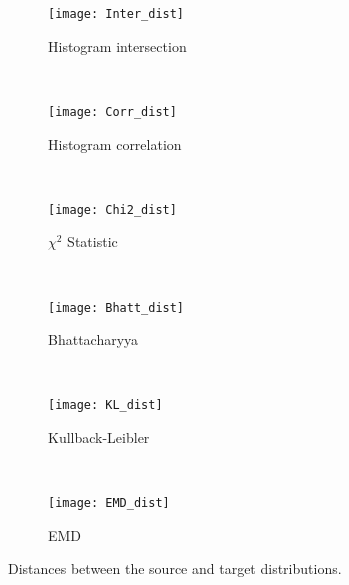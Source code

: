 \begin{figure}[!ht]
    \centering
    \begin{subfigure}[b]{0.3\textwidth}
		\centering
		\texttt{[image: Inter\_dist]}	
		\caption{Histogram intersection}
        \label{fig:inter_dist}
	\end{subfigure}
	~ %
    \begin{subfigure}[b]{0.3\textwidth}
		\centering
		\texttt{[image: Corr\_dist]}	
		\caption{Histogram correlation}
        \label{fig:corr_dist}
	\end{subfigure}
    ~ %
    \begin{subfigure}[b]{0.3\textwidth}
		\centering
		\texttt{[image: Chi2\_dist]}	
		\caption{$\chi^2$ Statistic}
        \label{fig:chi_square}
	\end{subfigure}  \\[2ex]
	
	
	\begin{subfigure}[b]{0.3\textwidth}
		\centering
		\texttt{[image: Bhatt\_dist]}	
		\caption{Bhattacharyya}
        \label{fig:bhatt_dist}
	\end{subfigure}
	~ %
    \begin{subfigure}[b]{0.3\textwidth}
		\centering
		\texttt{[image: KL\_dist]}	
		\caption{Kullback-Leibler}
        \label{fig:kl_div}
	\end{subfigure}
    ~ %
    \begin{subfigure}[b]{0.3\textwidth}
		\centering
		\texttt{[image: EMD\_dist]}	
		\caption{EMD}
        \label{fig:emd}
	\end{subfigure}
   
   \caption{Distances between the source and target distributions.}
   \label{fig:distances}
\end{figure}


